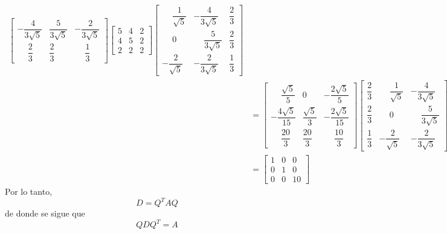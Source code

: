 \begin{example}
\begin{align*}
\begin{bmatrix}
            -\dfrac{4}{3\sqrt{5}} & \dfrac{5}{3\sqrt{5}} & - \dfrac{2}{3\sqrt{5}} \\[3mm]
            \phantom{-} \dfrac{2}{3} & \dfrac{2}{3} & \phantom{-} \dfrac{1}{3}
        \end{bmatrix} \begin{bmatrix}
            5 & 4 & 2 \\
            4 & 5 & 2 \\
            2 & 2 & 2
        \end{bmatrix} \begin{bmatrix}
            \phantom{-} \dfrac{1}{\sqrt{5}} & - \dfrac{4}{3\sqrt{5}} & \dfrac{2}{3} \\[3mm]
            \phantom{-} 0 & \phantom{-} \dfrac{5}{3\sqrt{5}} & \dfrac{2}{3} \\[3mm]
            - \dfrac{2}{\sqrt{5}} & - \dfrac{2}{3\sqrt{5}} & \dfrac{1}{3}
        \end{bmatrix} \\
        & = \begin{bmatrix}
            \phantom{-} \dfrac{\sqrt{5}}{5} & 0 & - \dfrac{2\sqrt{5}}{5} \\[3mm]
            -\dfrac{4\sqrt{5}}{15} & \dfrac{\sqrt{5}}{3} & - \dfrac{2\sqrt{5}}{15} \\[3mm]
            \phantom{-} \dfrac{20}{3} & \dfrac{20}{3} & \phantom{-} \dfrac{10}{3}
        \end{bmatrix} \begin{bmatrix}
            \dfrac{2}{3} & \phantom{-} \dfrac{1}{\sqrt{5}} & - \dfrac{4}{3\sqrt{5}} \\[3mm]
            \dfrac{2}{3} & \phantom{-} 0 & \phantom{-} \dfrac{5}{3\sqrt{5}} \\[3mm]
            \dfrac{1}{3} & - \dfrac{2}{\sqrt{5}} & - \dfrac{2}{3\sqrt{5}}
        \end{bmatrix} \\
        & = \begin{bmatrix}
            1 & 0 & 0 \\
            0 & 1 & 0 \\
            0 & 0 & 10
        \end{bmatrix}
    \end{align*}
    Por lo tanto,
    $$D = Q^T A Q$$
    de donde se sigue que
    $$QDQ^T = A$$\newpage\sideFigure[\label{ELLIPSX1Y1}]{\centering \begin{tikzpicture}
    \pgfmathsetmacro{\p}{1.0}
    \pgfmathsetmacro{\q}{0.5}
        \begin{axis}[

\end{axis}
\end{tikzpicture}}
\end{example}

